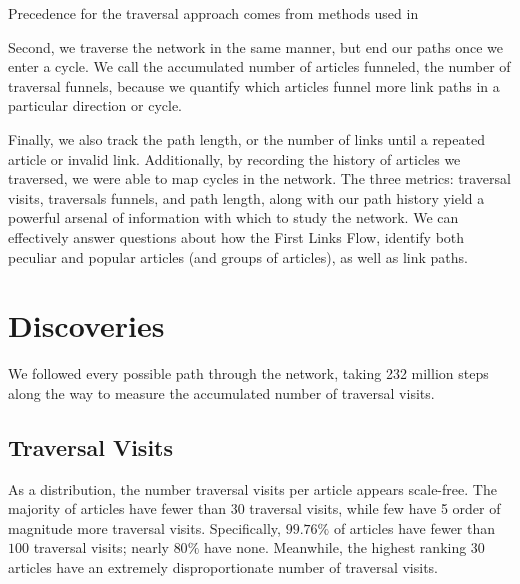 \documentclass[twoside]{article}
\newcommand{\red}[1]{{\leavevmode\color{sred}{#1}}} %
\begin{document}
\red{[[expand, explain better]]}


Precedence for the traversal approach comes from methods used in \red{[[river networks? leaf pruning approach in environmental studies? what to cite?]]}

Second, we traverse the network in the same manner, but end our paths once we enter a cycle.
We call the accumulated number of articles funneled, the number of traversal funnels, because we quantify
which articles funnel more link paths in a particular direction or cycle.

Finally, we also track the path length, or the number of links until a repeated article or invalid link.
Additionally, by recording the history of articles we traversed, we were able to map cycles in the network.
The three metrics: traversal visits, traversals funnels, and path length, along with our path history
yield a powerful arsenal of information with which to study the network. 
We can effectively answer questions about how the First Links Flow, identify both peculiar and popular
articles (and groups of articles), as well as link paths.



\section{Discoveries}

We followed every possible path through the network, taking 232 million steps along the way to measure the accumulated number of traversal visits.

\subsection{Traversal Visits}

As a distribution, the number traversal visits per article appears scale-free. The majority of articles have fewer than 30 traversal visits, while few 
have 5 order of magnitude more traversal visits. 
Specifically, $99.76\%$ of articles have fewer than $100$ traversal visits; nearly $80\%$ have none. 
Meanwhile, the highest ranking 30 articles have an extremely disproportionate number of traversal visits.
\end{document}
